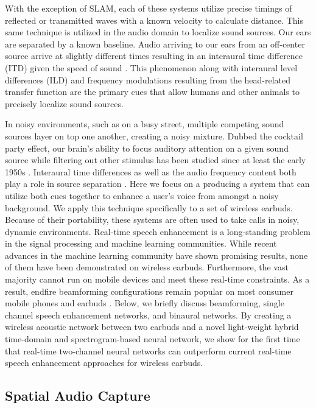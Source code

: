 \documentclass [11pt, proquest] {uwthesis}[2020/02/24]
\begin{document}
With the exception of SLAM, each of these systems utilize precise timings of reflected or transmitted waves with a known velocity to calculate distance. This same technique is utilized in the audio domain to localize sound sources. Our ears are separated by a known baseline. Audio arriving to our ears from an off-center source arrive at slightly different times resulting in an interaural time difference (ITD) given the speed of sound \cite{macpherson2002listener}. This phenomenon along with interaural level differences (ILD) and frequency modulations resulting from the head-related transfer function are the primary cues that allow humans and other animals to precisely localize sound sources.

In noisy environments, such as on a busy street, multiple competing sound sources layer on top one another, creating a noisy mixture. Dubbed the cocktail party effect, our brain's ability to focus auditory attention on a given sound source while filtering out other stimulus has been studied since at least the early 1950s \cite{pollack1957cocktail}. Interaural time differences as well as the audio frequency content both play a role in source separation \cite{Hirsh_binaural}. Here we focus on a producing a system that can utilize both cues together to enhance a user's voice from amongst a noisy background. We apply this technique specifically to a set of wireless earbuds. Because of their portability, these systems are often used to take calls in noisy, dynamic environments. Real-time speech enhancement is a long-standing problem in the signal processing and machine learning communities.  While recent advances in the machine learning community have shown promising results, none of them have been demonstrated on wireless earbuds. Furthermore, the vast majority cannot run on mobile devices and meet these real-time constraints. As a result, endfire beamforming configurations remain popular on most consumer mobile phones and earbuds \cite{samsungglobalnewsroom_2014, airpods, sennheiser_2020, beamforming-app-note}. Below, we briefly discuss beamforming, single channel speech enhancement networks, and binaural networks. By creating a wireless acoustic  network between two earbuds and a novel light-weight hybrid  time-domain and spectrogram-based  neural network, we show for the first time that real-time two-channel neural networks can outperform  current real-time speech enhancement approaches for wireless earbuds.

\subsection{Spatial Audio Capture}
\end{document}
